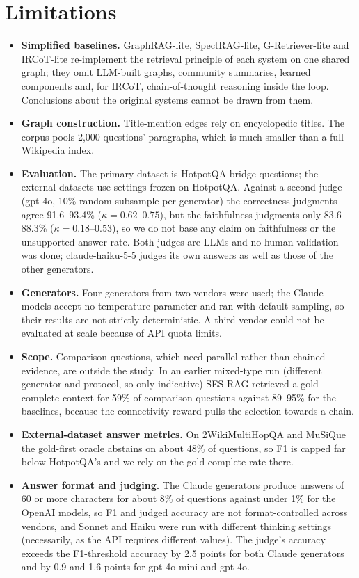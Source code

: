 \section{Limitations}
\label{sec:limits}
\begin{itemize}
\item \textbf{Simplified baselines.} GraphRAG-lite, SpectRAG-lite, G-Retriever-lite and IRCoT-lite re-implement the retrieval principle of each system on one shared graph; they omit LLM-built graphs, community summaries, learned components and, for IRCoT, chain-of-thought reasoning inside the loop. Conclusions about the original systems cannot be drawn from them.
\item \textbf{Graph construction.} Title-mention edges rely on encyclopedic titles. The corpus pools 2{,}000 questions' paragraphs, which is much smaller than a full Wikipedia index.
\item \textbf{Evaluation.} The primary dataset is HotpotQA bridge questions; the external datasets use settings frozen on HotpotQA. Against a second judge (gpt-4o, 10\% random subsample per generator) the correctness judgments agree 91.6--93.4\% ($\kappa=0.62$--$0.75$), but the faithfulness judgments only 83.6--88.3\% ($\kappa=0.18$--$0.53$), so we do not base any claim on faithfulness or the unsupported-answer rate. Both judges are LLMs and no human validation was done; claude-haiku-5-5 judges its own answers as well as those of the other generators.
\item \textbf{Generators.} Four generators from two vendors were used; the Claude models accept no temperature parameter and ran with default sampling, so their results are not strictly deterministic. A third vendor could not be evaluated at scale because of API quota limits.
\item \textbf{Scope.} Comparison questions, which need parallel rather than chained evidence, are outside the study. In an earlier mixed-type run (different generator and protocol, so only indicative) SES-RAG retrieved a gold-complete context for 59\% of comparison questions against 89--95\% for the baselines, because the connectivity reward pulls the selection towards a chain.
\item \textbf{External-dataset answer metrics.} On 2WikiMultiHopQA and MuSiQue the gold-first oracle abstains on about 48\% of questions, so F1 is capped far below HotpotQA's and we rely on the gold-complete rate there.
\item \textbf{Answer format and judging.} The Claude generators produce answers of 60 or more characters for about 8\% of questions against under 1\% for the OpenAI models, so F1 and judged accuracy are not format-controlled across vendors, and Sonnet and Haiku were run with different thinking settings (necessarily, as the API requires different values). The judge's accuracy exceeds the F1-threshold accuracy by 2.5 points for both Claude generators and by 0.9 and 1.6 points for gpt-4o-mini and gpt-4o.

\end{itemize}
